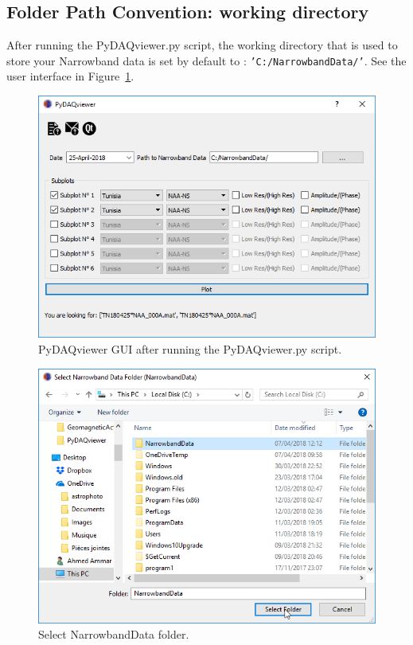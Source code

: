 \documentclass[%
oneside,                 %
final,                   %
10pt]{article}
\begin{document}
\noindent
\subsection{Folder Path Convention: working directory}
After running the PyDAQviewer.py script, the working directory that is used to store your Narrowband data is set by default to : \texttt{’C:/NarrowbandData/'}. See the user interface in Figure~\ref{fig:GUI}.


\begin{figure}[!ht]  %
  \centerline{\includegraphics[width=1.0\linewidth]{imgs/GUI_PyDAQviewer.png}}
  \caption{
  PyDAQviewer GUI after running the PyDAQviewer.py script. \label{fig:GUI}
  }
\end{figure}





\begin{figure}[!ht]  %
  \centerline{\includegraphics[width=1.0\linewidth]{imgs/opendir.png}}
  \caption{
  Select NarrowbandData folder. \label{fig:SelectFolder}
  }
\end{figure}
\end{document}
